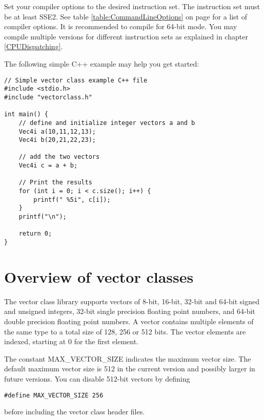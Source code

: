 \documentclass[vcl_manual.tex]{subfiles}
\begin{document}
Set your compiler options to the desired instruction set. The instruction set must be at least SSE2. See table \ref{table:CommandLineOptions} on page \pageref{table:CommandLineOptions} for a list of compiler options. It is recommended to compile for 64-bit mode.
You may compile multiple versions for different instruction sets as explained in chapter \ref{CPUDispatching}.


The following simple C++ example may help you get started:

\begin{example}
\label{exampleArrayLoop3}
\end{example} 
\begin{lstlisting}[frame=single]
// Simple vector class example C++ file
#include <stdio.h>
#include "vectorclass.h"

int main() {
    // define and initialize integer vectors a and b
    Vec4i a(10,11,12,13);
    Vec4i b(20,21,22,23);

    // add the two vectors
    Vec4i c = a + b;

    // Print the results
    for (int i = 0; i < c.size(); i++) {
        printf(" %5i", c[i]);
    }
    printf("\n");

    return 0;
}
\end{lstlisting}

\section{Overview of vector classes} \label{OverviewOfVectorClasses}
The vector class library supports vectors of 8-bit, 16-bit, 32-bit and 64-bit signed and unsigned integers, 32-bit single precision floating point numbers, and 64-bit double precision floating point numbers. A vector contains multiple elements of the same type to a total size of 128, 256 or 512 bits. The vector elements are indexed, starting at 0 for the first element.

The constant MAX\_VECTOR\_SIZE indicates the maximum vector size. The default maximum vector size is 512 in the current version and possibly larger in future versions. You can disable 512-bit vectors by defining
\begin{lstlisting}[frame=none]
    #define MAX_VECTOR_SIZE 256
\end{lstlisting}
before including the vector class header files.
\end{document}
